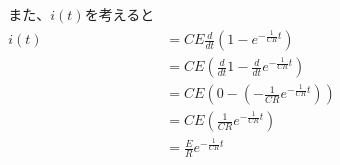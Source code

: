 \documentclass[10pt,dvipdfmx]{article}[b5paper]
\begin{document}
\begin{align*}
\text{また、}i(t)\text{を考えると}\\
i(t) &= CE \frac{d}{dt} \left(1 - e^{-\frac{1}{CR} t}\right) \\
&= CE \left(\frac{d}{dt} 1 - \frac{d}{dt} e^{-\frac{1}{CR} t}\right) \\
&= CE \left(0 - \left(-\frac{1}{CR} e^{-\frac{1}{CR} t}\right)\right) \\
&= CE \left(\frac{1}{CR} e^{-\frac{1}{CR} t}\right) \\
&= \frac{E}{R} e^{-\frac{1}{CR} t}
\end{align*}
\end{document}
